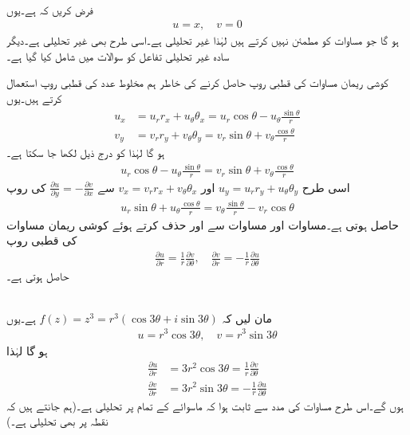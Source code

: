 \quad {}\\
فرض کریں کہ  ہے۔یوں
\begin{align*}
u=x,\quad v=0
\end{align*}
ہو گا جو مساوات  کو مطمئن نہیں کرتے ہیں لہٰذا  غیر تحلیلی ہے۔اسی طرح  بھی غیر تحلیلی ہے۔دیگر سادہ غیر تحلیلی تفاعل کو سوالات میں شامل کیا گیا ہے۔

کوشی ریمان مساوات کی قطبی روپ حاصل کرنے کی خاطر ہم مخلوط عدد کی قطبی روپ  استعمال کرتے ہیں۔یوں
\begin{align*}
u_x&=u_rr_x+u_{\theta}\theta_x=u_r\cos\theta-u_{\theta}\frac{\sin\theta}{r}\\
v_y&=v_rr_y+v_{\theta}\theta_y=v_r\sin\theta+v_{\theta}\frac{\cos\theta}{r}
\end{align*}
ہو گا لہٰذا  کو درج ذیل لکھا جا سکتا ہے۔
\begin{align}\label{مساوات_مخلوط_کوشی_قطبی_ضمنی_الف}
u_r\cos\theta-u_{\theta}\frac{\sin\theta}{r}=v_r\sin\theta+v_{\theta}\frac{\cos\theta}{r}
\end{align}
اسی طرح
$u_y=u_rr_y+u_{\theta}\theta_y$
اور
$ v_x=v_rr_x+v_{\theta}\theta_x$
سے 
$\tfrac{\partial u}{\partial y}=-\tfrac{\partial v}{\partial x}$
کی روپ
\begin{align}\label{مساوات_مخلوط_کوشی_قطبی_ضمنی_ب}
u_r\sin\theta+u_{\theta}\frac{\cos\theta}{r}=v_{\theta}\frac{\sin\theta}{r}-v_r\cos\theta
\end{align}
حاصل ہوتی ہے۔مساوات  اور مساوات  سے  اور  حذف کرتے ہوئے کوشی ریمان مساوات کی قطبی روپ
\begin{align}\label{مساوات_مخلوط_کوشی_ریمان_قطبی_روپ}
\frac{\partial u}{\partial r}=\frac{1}{r}\frac{\partial v}{\partial \theta},\quad \frac{\partial v}{\partial r}=-\frac{1}{r}\frac{\partial u}{\partial \theta}
\end{align}
حاصل ہوتی ہے۔

\quad {}\\
مان لیں کہ 
$f(z)=z^3=r^3(\cos3\theta+i\sin 3\theta)$
ہے۔یوں
\begin{align*}
u=r^3\cos 3\theta,\quad v=r^3\sin 3\theta
\end{align*}
ہو گا لہٰذا
\begin{align*}
\frac{\partial u}{\partial r}&=3r^2\cos3\theta=\frac{1}{r}\frac{\partial v}{\partial \theta}\\
\frac{\partial v}{\partial r}&=3r^2\sin3\theta=-\frac{1}{r}\frac{\partial u}{\partial \theta}
\end{align*}
ہوں گے۔اس طرح مساوات  کی مدد سے ثابت ہوا کہ  ماسوائے  کے تمام  پر تحلیلی ہے۔(ہم جانتے ہیں کہ  نقطہ  پر بھی تحلیلی ہے۔)

